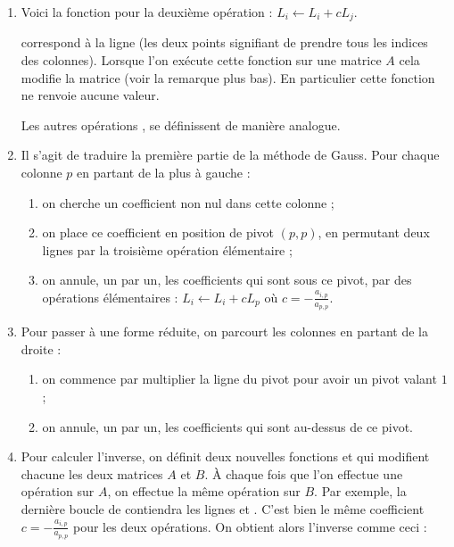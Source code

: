 \documentclass[class=report,crop=false]{standalone}
\begin{document}
\begin{enumerate}
  \item Voici la fonction pour la deuxième opération : $L_i \leftarrow L_i+ c L_j$.
  
   
   correspond à la ligne  (les deux points signifiant 
  de prendre tous les indices des colonnes).
  Lorsque l'on exécute cette fonction sur une matrice $A$ cela modifie la matrice (voir la 
  remarque plus bas). En particulier cette fonction ne renvoie aucune valeur.

  Les autres opérations , 
  se définissent de manière analogue.
  
  
  \item 
  Il s'agit de traduire la première partie de la méthode de Gauss.
  Pour chaque colonne $p$ en partant de la plus à gauche :
  \begin{enumerate}
    \item on cherche un coefficient non nul dans cette colonne ;
    \item on place ce coefficient en position de pivot $(p,p)$, 
    en permutant deux lignes par la troisième opération élémentaire ;
    \item on annule, un par un, les coefficients qui sont sous ce pivot, par des opérations élémentaires :
    $L_i \leftarrow L_i+ c L_p$ où $c = -\frac{a_{i,p}}{a_{p,p}}$. 
  \end{enumerate}
  

  \item Pour passer à une forme réduite, on parcourt les colonnes en partant de la droite : 
  \begin{enumerate}
    \item on commence par multiplier la ligne du pivot pour avoir un pivot valant $1$ ;
    \item on annule, un par un, les coefficients qui sont au-dessus de ce pivot.
  \end{enumerate}
  
  
  
  \item Pour calculer l'inverse, on définit deux nouvelles fonctions  et
  qui modifient chacune les deux matrices $A$ et $B$.
  À chaque fois que l'on effectue une opération sur $A$, on effectue la même opération sur $B$.
  Par exemple, la dernière boucle de 
  contiendra les lignes  et .
  C'est bien le même coefficient $c = -\frac{a_{i,p}}{a_{p,p}}$ pour les deux opérations. 
  On obtient alors l'inverse comme ceci :
  
\end{enumerate}
\end{document}
